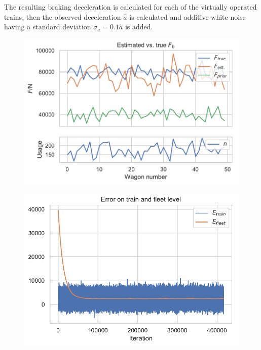 \documentclass[a4paper, 12pt]{scrartcl}
\begin{document}
The resulting braking deceleration is calculated for each of the virtually operated trains, then the observed deceleration $\hat{a}$ is calculated and additive white noise having a standard deviation $\sigma_{a} = 0.1\hat{a}$ is added. 
\begin{centering}
\begin{figure}
\begin{minipage}[t]{0.45\textwidth} 
\includegraphics[width = \textwidth]{190121FleetEstimate}
\label{Fig:BrakingF}
\end{minipage}
\begin{minipage}[t]{0.1\textwidth} 

\end{minipage}
\begin{minipage}[t]{0.45\textwidth} 
\includegraphics[width = \textwidth]{190121Errors}
\label{Fig:BrakingError}
\end{minipage}

\end{figure}
\end{centering}
\end{document}
